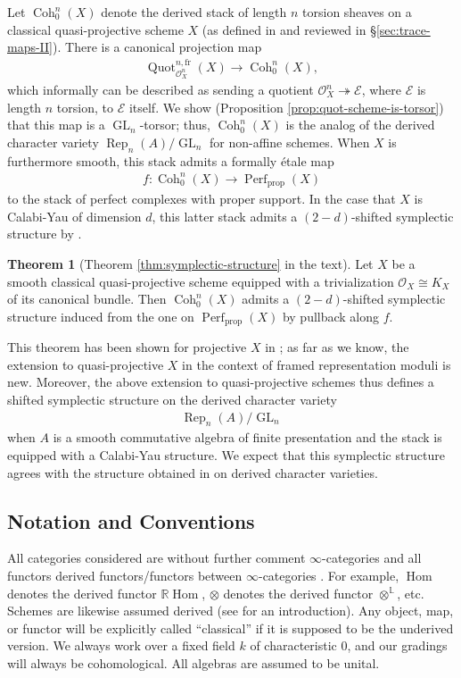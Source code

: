\documentclass{article}
\numberwithin{equation}{section}
\theoremstyle{quest}
\theoremstyle{definition}
\newtheorem{thm}{Theorem}[section]
\theoremstyle{remark}
\newcommand{\R}{\mathbb{R}}
\DeclareMathOperator{\GL}{GL}
\DeclareMathOperator{\Hom}{Hom}
\DeclareMathOperator{\Rep}{Rep}
\DeclareMathOperator{\Coh}{Coh}
\DeclareMathOperator{\Quot}{Quot}
\DeclareMathOperator{\Perf}{Perf}
\begin{document}
Let $\Coh^n_0(X)$ denote the derived stack of length $n$ torsion sheaves on a classical quasi-projective scheme $X$ (as defined in \cite{PS} and reviewed in \S\ref{sec:trace-maps-II}). There is a canonical projection map
\begin{align*}
	\Quot^{n,\text{fr}}_{\mathscr{O}^n_X}(X)\to \Coh^n_0(X),
\end{align*} 
which informally can be described as sending a quotient $\mathscr{O}^n_X\twoheadrightarrow \mathscr{E}$, where $\mathscr{E}$ is length $n$ torsion, to $\mathscr{E}$ itself. We show (Proposition \ref{prop:quot-scheme-is-torsor}) that this map is a $\GL_n$-torsor; thus, $\Coh^n_0(X)$ is the analog of the derived character variety $\Rep_n(A) /\GL_n$ for non-affine schemes. When $X$ is furthermore smooth, this stack admits a formally \'etale map
\begin{align*}
	f:\Coh^n_0(X)\to \Perf_{\text{prop}}(X)
\end{align*} 
to the stack of perfect complexes with proper support. In the case that $X$ is Calabi-Yau of dimension $d$, this latter stack admits a $(2-d)$-shifted symplectic structure by \cite{BD}.
\begin{thm}[Theorem \ref{thm:symplectic-structure} in the text]
	Let $X$ be a smooth classical quasi-projective scheme equipped with a trivialization $\mathscr{O}_X\cong K_X$ of its canonical bundle. Then $\Coh^n_0(X)$ admits a $(2-d)$-shifted symplectic structure induced from the one on $\Perf_{\text{prop}}(X)$ by pullback along $f$.
\end{thm} 
This theorem has been shown for projective $X$ in \cite{BKSv2}; as far as we know, the extension to quasi-projective $X$ in the context of framed representation moduli is new. Moreover, the above extension to quasi-projective schemes thus defines a shifted symplectic structure on the derived character variety
\begin{align*}
	\Rep_n(A) /\GL_n
\end{align*} 
when $A$ is a smooth commutative algebra of finite presentation and the stack is equipped with a Calabi-Yau structure. We expect that this symplectic structure agrees with the structure obtained in \cite{symplectic-structure} on derived character varieties.

\subsection{Notation and Conventions}\label{sec:notation-and-conventions}
All categories considered are without further comment $\infty$-categories and all functors derived functors/functors between $\infty$-categories \cite{HTT}. For example, $\Hom$ denotes the derived functor $\R \Hom$, $\otimes $ denotes the derived functor $\otimes ^{\mathbb{L}}$, etc. Schemes are likewise assumed derived (see \cite{GR} for an introduction). Any object, map, or functor will be explicitly called ``classical'' if it is supposed to be the underived version. We always work over a fixed field $k$ of characteristic 0, and our gradings will always be cohomological. All algebras are assumed to be unital.
\end{document}
